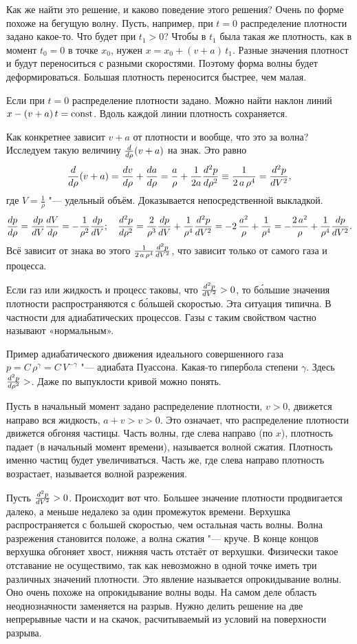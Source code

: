 Как же найти это решение, и каково поведение этого решения? Очень по форме похоже на бегущую волну. Пусть, например, при $t=0$ распределение плотности задано какое-то. Что будет при $t_1>0$? Чтобы в $t_1$ была такая же плотность, как в момент $t_0=0$ в точке $x_0$, нужен $x = x_0 + (v+a)\,t_1$. Разные значения плотност и будут переноситься с разными скоростями. Поэтому форма волны будет деформироваться. Большая плотность переносится быстрее, чем малая.

Если при $t=0$ распределение плотности задано. Можно найти наклон линий $x - (v+a)\,t = \operatorname{const}$. Вдоль каждой линии плотность сохраняется.

Как конкретнее зависит $v+a$ от плотности и вообще, что это за волна?
Исследуем такую величину 
$\frac{d }{d\rho}(v+a)$
на знак. Это равно
\[
  \frac{d }{d\rho}(v+a) = \frac{dv}{d\rho} + \frac{da}{d\rho} = \frac a\rho + \frac1{2a}\frac{d^2p}{d\rho^2}\equiv
\frac1{2\,a\,\rho^4} = \frac{d^2p}{dV^2},
\]
где $V=\frac1\rho$ "--- удельный объём. Доказывается непосредственной выкладкой.
\[
  \frac{dp}{d\rho} = \frac{dp}{dV}\frac{dV}{d\rho} = -\frac1{\rho^2}\frac{dp}{dV};\quad
  \frac{d^2p}{d\rho^2} = \frac{2}{\rho^3}\frac{dp}{dV} + \frac1{\rho^4}\frac{d^2p}{dV^2} = 
  -2\,\frac{a^2}{\rho} + \frac1{\rho^4} = -\frac{2\,a^2}\rho + \frac1{\rho^4}\frac{dp}{dV^2}.
\]
Всё зависит от знака во этого $\frac1{2\,a\,\rho^4}\frac{d^2p}{dV^2}$, что зависит только от самого газа и процесса.

Если газ или жидкость и процесс таковы, что $\frac{d^2p}{dV^2}>0$, то б\'{о}льшие значения плотности распространяются с б\'{о}льшей скоростью. Эта ситуация типична. В частности для адиабатических процессов. Газы с таким свойством частно называют «нормальным».

Пример адиабатического движения идеального совершенного газа $p=C\,\rho^\gamma = C\,V^{-\gamma}$ "--- адиабата Пуассона. Какая-то гипербола степени $\gamma$. Здесь $\frac{d^2p}{d\rho^2}>$. Даже по выпуклости кривой можно понять.

Пусть в начальный момент задано распределение плотности, $v>0$, движется направо вся жидкость, $a+v>v>0$. Это означает, что распределение плотности движется обгоняя частицы. Часть волны, где слева направо (по $x$), плотность падает (в начальный момент времени), называется волной сжатия. Плотность именно частиц будет увеличиваться. Часть же, где слева направо плотность возрастает, называется волной разрежения.

Пусть $\frac{d^2p}{dV^2}>0$. Происходит вот что. Большее значение плотности продвигается далеко, а меньше недалеко за один промежуток времени. Верхушка распространяется с большей скоростью, чем остальная часть волны. Волна разрежения становится положе, а волна сжатия "--- круче. В конце концов верхушка обгоняет хвост, нижняя часть отстаёт от верхушки. Физически такое отставание не осуществимо, так как невозможно в одной точке иметь три различных значений плотности. Это явление называется опрокидывание волны. Оно очень похоже на опрокидывание волны воды. На самом деле область неоднозначности заменяется на разрыв. Нужно делить решение на две непрерывные части и на скачок, расчитываемый из условий на поверхности разрыва.

